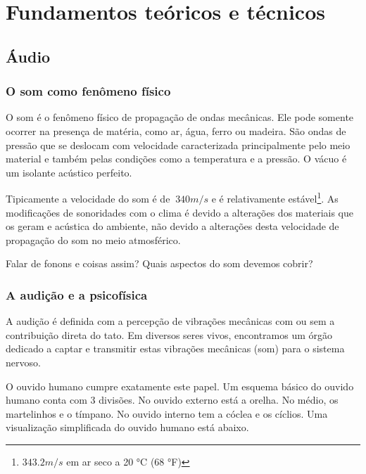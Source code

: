 \chapter{Fundamentos teóricos e técnicos} %

\section{Áudio}

\subsection{O som como fenômeno físico}

O som é o fenômeno físico de propagação de ondas mecânicas. Ele pode
somente ocorrer na presença de matéria, como ar, água, ferro ou madeira.
São ondas de pressão que se deslocam com velocidade caracterizada principalmente
pelo meio material e também pelas condições como a temperatura e a pressão.
O vácuo é um isolante acústico perfeito.

Tipicamente a velocidade do som é de $~340 m/s $ e é
relativamente estável\footnote{$343.2 m/s$ em ar seco a 20 °C (68 °F)}.
As modificações de sonoridades com o clima é devido a alterações
dos materiais que os geram e acústica do ambiente, não devido a alterações
desta velocidade de propagação do som no meio atmosférico.

Falar de fonons e coisas assim? Quais aspectos do som devemos cobrir?

\subsection{A audição e a psicofísica}

A audição é definida com a percepção de vibrações mecânicas com
ou sem a contribuição direta do tato. Em diversos
seres vivos, encontramos um órgão dedicado a captar e transmitir
estas vibrações mecânicas (som) para o sistema nervoso.

O ouvido humano cumpre exatamente este papel. Um esquema básico
do ouvido humano conta com 3 divisões. No ouvido externo está a orelha.
No médio, os martelinhos e o tímpano. No ouvido interno tem a cóclea
e os cíclios. Uma visualização simplificada do ouvido humano está abaixo.



